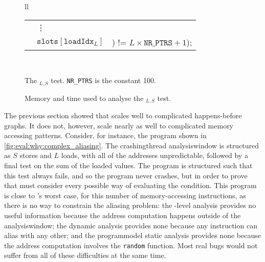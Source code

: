 \begin{figure}
{{\begin{tabular}{ll}
\begin{tabular}{lll}
         & \vdots \\
         &\hspace{-4mm}$\texttt{slots}[\texttt{loadIdx}_L]$ &\hspace{-3mm}) != $L{\times}\texttt{NR\_PTRS} + 1$);\\
       \end{tabular}\\
    \end{tabular}
    }
  }
  {\hfill}
  {\hfill}
  \caption{The $_{L,S}$ test.
    \texttt{NR\_PTRS} is the constant 100.  }
  \label{fig:eval:why:complex_aliasing}
\end{figure}

\begin{figure}
  \caption{Memory and time used to analyse the
    $_{L,S}$ test.}
  \label{fig:eval:why:complex_aliasing:result1}
\end{figure}

The previous section showed that {\technique} scales well to
complicated happens-before graphs.  It does not, however, scale nearly
as well to complicated memory accessing patterns.  Consider, for
instance, the program shown in
\autoref{fig:eval:why:complex_aliasing}.  The \gls{crashingthread}
\gls{analysiswindow} is structured as $S$ stores and $L$ loads, with
all of the addresses unpredictable, followed by a final test on the
sum of the loaded values.  The program is structured such that this
test always fails, and so the program never crashes, but in order to
prove that {\technique} must consider every possible way of evaluating
the condition.  This program is close to {\technique}'s worst case,
for this number of memory-accessing instructions, as there is no way
to constrain the aliasing problem: the {\StateMachine}-level analysis
provides no useful information because the address computation happens
outside of the \gls{analysiswindow}; the dynamic analysis provides
none because any instruction can alias with any other; and the
\gls{programmodel} static analysis provides none because the address
computation involves the \texttt{random} function.  Most real bugs
would not suffer from all of these difficulties at the same time.

